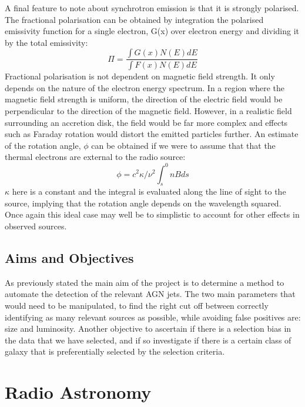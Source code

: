 \documentclass{article}
\begin{document}
A final feature to note about synchrotron emission is that it is strongly polarised. The fractional polarisation can be obtained by integration the polarised emissivity function for a single electron, G(x) over electron energy and dividing it by the total emissivity:
\begin{equation}
    \Pi = \frac{\int G(x)N(E)dE}{\int F(x)N(E)dE}
\end{equation}
Fractional polarisation is not dependent on magnetic field strength. It only depends on the nature of the electron energy spectrum. In a region where the magnetic field strength is uniform, the direction of the electric field would be perpendicular to the direction of the magnetic field. However, in a realistic field surrounding an accretion disk, the field would be far more complex and effects such as Faraday rotation would distort the emitted particles further. An estimate of the rotation angle, $\phi$ can be obtained if we were to assume that that the thermal electrons are external to the radio source:
\begin{equation}
    \phi = c^2\kappa/\nu^2 \int_{s}^{0} nBds
\end{equation}
$\kappa$ here is a constant and the integral is evaluated along the line of sight to the source, implying that the rotation angle depends on the wavelength squared. Once again this ideal case may well be to simplistic to account for other effects in observed sources.

\subsection{Aims and Objectives}

As previously stated the main aim of the project is to determine a method to automate the detection of the relevant AGN jets. The two main parameters that would need to be manipulated, to find the right cut off between correctly identifying as many relevant sources as possible, while avoiding false positives are: size and luminosity. Another objective to ascertain if there is a selection bias in the data that we have selected, and if so investigate if there is a certain class of galaxy that is preferentially selected by the selection criteria. \newpage

\section{Radio Astronomy}
\end{document}
